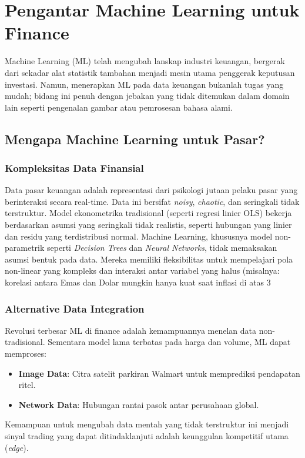 \documentclass[12pt,a4paper]{book}
\begin{document}
\chapter{Pengantar Machine Learning untuk Finance}
Machine Learning (ML) telah mengubah lanskap industri keuangan, bergerak dari sekadar alat statistik tambahan menjadi mesin utama penggerak keputusan investasi. Namun, menerapkan ML pada data keuangan bukanlah tugas yang mudah; bidang ini penuh dengan jebakan yang tidak ditemukan dalam domain lain seperti pengenalan gambar atau pemrosesan bahasa alami.

\section{Mengapa Machine Learning untuk Pasar?}
\subsection{Kompleksitas Data Finansial}
Data pasar keuangan adalah representasi dari psikologi jutaan pelaku pasar yang berinteraksi secara real-time. Data ini bersifat \textit{noisy}, \textit{chaotic}, dan seringkali tidak terstruktur. Model ekonometrika tradisional (seperti regresi linier OLS) bekerja berdasarkan asumsi yang seringkali tidak realistis, seperti hubungan yang linier dan residu yang terdistribusi normal.
Machine Learning, khususnya model non-parametrik seperti \textit{Decision Trees} dan \textit{Neural Networks}, tidak memaksakan asumsi bentuk pada data. Mereka memiliki fleksibilitas untuk mempelajari pola non-linear yang kompleks dan interaksi antar variabel yang halus (misalnya: korelasi antara Emas dan Dolar mungkin hanya kuat saat inflasi di atas 3%

\subsection{Alternative Data Integration}
Revolusi terbesar ML di finance adalah kemampuannya menelan data non-tradisional. Sementara model lama terbatas pada harga dan volume, ML dapat memproses:
\begin{itemize}
    \textbf{Text Data}: Sentimen berita, tweet, dan transkrip earning calls.
    \item \textbf{Image Data}: Citra satelit parkiran Walmart untuk memprediksi pendapatan ritel.
    \item \textbf{Network Data}: Hubungan rantai pasok antar perusahaan global.
\end{itemize}
Kemampuan untuk mengubah data mentah yang tidak terstruktur ini menjadi sinyal trading yang dapat ditindaklanjuti adalah keunggulan kompetitif utama (\textit{edge}).
\end{document}

